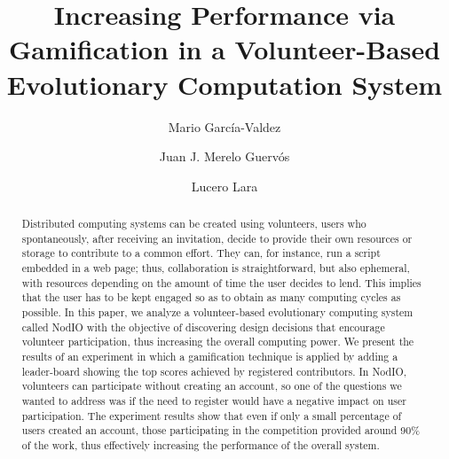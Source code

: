 \documentclass{llncs}
\begin{document}
\sloppy

\title{Increasing Performance via Gamification in a Volunteer-Based Evolutionary Computation System}

\author{Mario Garc\'ia-Valdez \and Juan J. Merelo Guerv\'os \and  Lucero Lara }



\maketitle


\begin{abstract}

Distributed computing systems can be created using volunteers, users who spontaneously, after receiving an invitation, decide to
provide their own resources or storage to contribute to a common
effort. They can, for instance, run a script embedded in a web page;
thus, collaboration is straightforward, but also ephemeral, with
resources depending on the amount of time the user decides to
lend. This implies that the user has to be kept engaged so as to
obtain as many computing cycles as possible. In this paper, we analyze
a volunteer-based evolutionary computing system called  NodIO
 with the objective of discovering design decisions that
encourage volunteer participation, thus increasing the overall
computing power. We present the results of an experiment in which a
gamification technique is applied by adding a leader-board showing the
top scores achieved by registered contributors. In NodIO,
volunteers can participate without creating an account, so one of the questions we wanted to address was if the
need to register would have a negative impact on user participation.
The experiment results show that even if only a small percentage of
users created an account, those participating in the competition
provided around 90\% of the work, thus effectively increasing the
performance of the overall system.

\end{abstract}
\end{document}

